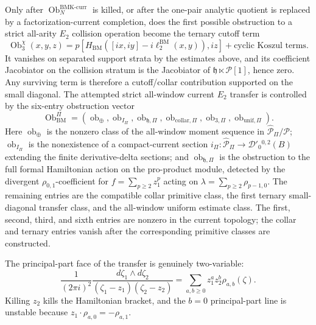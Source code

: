 \documentclass[11pt]{memoir}
\begin{document}
\begin{prop}
  Only after
  \(\operatorname{Ob}^{\mathrm{BMK\mbox{-}curr}}_N\) is killed, or after
  the one-pair analytic quotient is replaced by a
  factorization-current completion, does the first possible obstruction to
  a strict all-arity \(E_2\) collision operation become the ternary cutoff
  term
  \[
    \operatorname{Ob}_3^\chi(x,y,z)
      =
      p[H_{\mathrm{BM}}([ix,iy]-i\ell_2^{\mathrm{BM}}(x,y)),iz]
      +\text{cyclic Koszul terms}.
  \]
  It vanishes on separated support strata by the estimates above, and
  its coefficient Jacobiator on the collision stratum is the Jacobiator
  of \(\mathfrak h\ltimes\mathcal P[1]\), hence zero.  Any surviving
  term is therefore a cutoff/collar contribution supported on the small
  diagonal.  The attempted strict all-window current \(E_2\) transfer is
  controlled by the six-entry obstruction vector
  \[
    \operatorname{Ob}^{\Pi}_{\mathrm{BM}}
      =
      \left(
      \operatorname{ob}_{\oplus},
      \operatorname{ob}_{I_\Pi},
      \operatorname{ob}_{\mathfrak h,\Pi},
      \operatorname{ob}_{\mathrm{collar},\Pi},
      \operatorname{ob}_{3,\Pi},
      \operatorname{ob}_{\mathrm{unif},\Pi}
      \right).
  \]
  Here \(\operatorname{ob}_{\oplus}\) is the nonzero class of the
  all-window moment sequence in
  \(\widehat{\mathcal P}_{\Pi}/\mathcal P\);
  \(\operatorname{ob}_{I_\Pi}\) is the nonexistence of a compact-current
  section
  \(i_\Pi:\widehat{\mathcal P}_{\Pi}\to\mathcal D'_0{}^{0,2}(B)\)
  extending the finite derivative-delta sections; and
  \(\operatorname{ob}_{\mathfrak h,\Pi}\) is the obstruction to the full
  formal Hamiltonian action on the pro-product module, detected by the
  divergent \(\rho_{0,1}\)-coefficient for
  \(f=\sum_{p\ge2}z_1^p\) acting on
  \(\lambda=\sum_{p\ge2}\rho_{p-1,0}\).  The remaining entries are the
  compatible collar primitive class, the first ternary small-diagonal
  transfer class, and the all-window uniform estimate class.  The first,
  second, third, and sixth entries are nonzero in the current
  topology; the collar and ternary entries vanish after the corresponding
  primitive classes are constructed.

  The principal-part face of the transfer is genuinely two-variable:
  \[
    \frac{1}{(2\pi i)^2}
    \frac{d\zeta_1\wedge d\zeta_2}
         {(\zeta_1-z_1)(\zeta_2-z_2)}
    =
    \sum_{a,b\geq0}z_1^az_2^b\rho_{a,b}(\zeta).
  \]
  Killing \(z_2\) kills the Hamiltonian bracket, and the \(b=0\)
  principal-part line is unstable because
  \(z_1\cdot\rho_{a,0}=-\rho_{a,1}\).
\end{prop}
\end{document}

